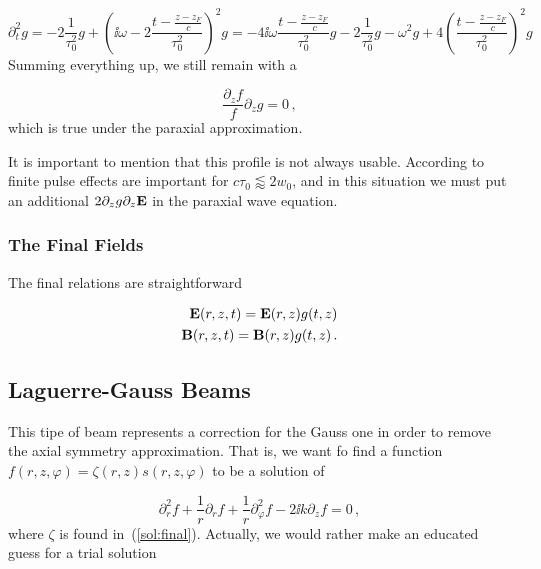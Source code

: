 \documentclass[12pt, class=report, crop=false]{standalone}
\begin{document}
\begin{equation}
  \partial_t^2 g = - 2 \frac{1}{\tau_0^2} g + \left(\ii \omega - 2 \frac{t-\frac{z-z_F}{c}}{\tau_0^2} \right)^2 g = - 4\ii \omega \frac{t-\frac{z-z_F}{c}}{\tau_0^2} g - 2 \frac{1}{\tau_0^2} g - \omega^2 g+ 4 \left(\frac{t-\frac{z-z_F}{c}}{\tau_0^2} \right)^2 g
\end{equation}
Summing everything up, we still remain with a

\begin{equation}
  \frac{\partial_z f}{f} \partial_z g = 0\,,
\end{equation}
which is true under the paraxial approximation. %

It is important to mention that this profile is not always usable. According to~\cite{quesnelTheorySimulationInteraction1998} finite pulse effects are important for \(c\tau_0  \lessapprox 2w_0\), and in this situation we must put an additional \(2 \partial_z
 g \partial_z \vb{E}\) in the paraxial wave equation.

\subsubsection{The Final Fields}

The final relations are straightforward

\begin{subequations}
  \begin{align}
    \vb{E}(r,z,t) = \vb{E}(r,z) g(t,z) \\
    \vb{B}(r,z,t) = \vb{B}(r,z) g(t,z)\,.
  \end{align}
\end{subequations}

\subsection{Laguerre-Gauss Beams}
This tipe of beam represents a correction for the Gauss one in order to remove the axial symmetry approximation. That is, we want fo find a function \(f(r,z,\varphi) = \zeta (r,z) s(r,z,\varphi)\) to be a solution of

\begin{equation}
  \partial_r^2 f +\frac{1}{r} \partial_r f + \frac{1}{r} \partial_\varphi^2 f - 2 \ii k \partial_z f = 0 \,,
\end{equation}
where \(\zeta\) is found in~(\ref{sol:final}). Actually, we would rather make an educated guess for a trial solution
\end{document}

